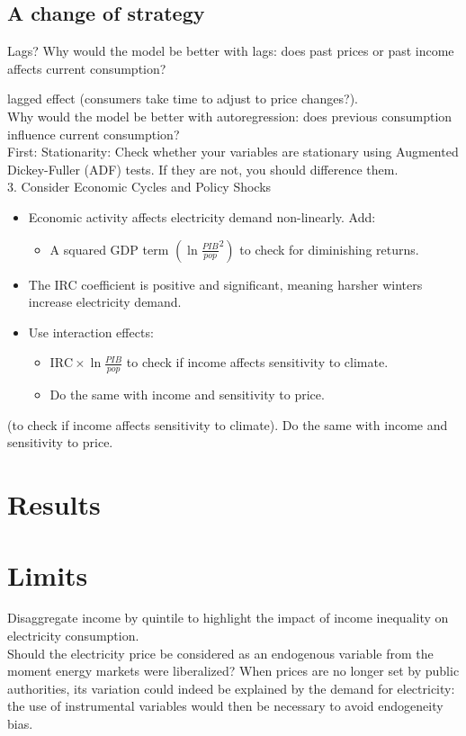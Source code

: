 \subsection{A change of strategy}
Lags? Why would the model be better with lags: does past prices or past income affects current consumption? 

lagged effect (consumers take time to adjust to price changes?).\\

Why would the model be better with autoregression: does previous consumption influence current consumption? \\

First: Stationarity: Check whether your variables are stationary using Augmented Dickey-Fuller (ADF) tests. If they are not, you should difference them. \\

3. Consider Economic Cycles and Policy Shocks
    \begin{itemize}
        \item Economic activity affects electricity demand non-linearly. Add:
        \begin{itemize}
            \item A squared GDP term $(\ln{\frac{{PIB}}{pop}}^2)$ to check for diminishing returns.
        \end{itemize}
        \item The IRC coefficient is positive and significant, meaning harsher winters increase electricity demand.
        \item Use interaction effects:
        \begin{itemize}
            \item $\text{IRC} \times \ln{\frac{PIB}{pop}}$ to check if income affects sensitivity to climate.
            \item Do the same with income and sensitivity to price.
        \end{itemize}
    \end{itemize}


(to check if income affects sensitivity to climate). Do the same with income and sensitivity to price. \\


\section{Results}

\section{Limits}
Disaggregate income by quintile to highlight the impact of income inequality on electricity consumption. \\

Should the electricity price be considered as an endogenous variable from the moment energy markets were liberalized? When prices are no longer set by public authorities, its variation could indeed be explained by the demand for electricity: the use of instrumental variables would then be necessary to avoid endogeneity bias.
